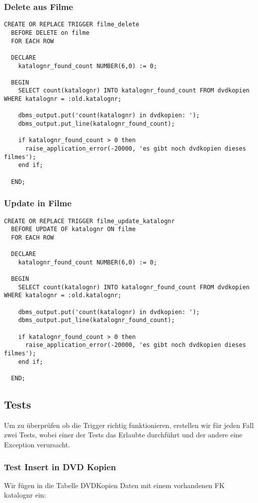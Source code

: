 \documentclass[11pt,a4paper,parskip=half]{scrartcl}
\begin{document}
\subsubsection{Delete aus Filme}
\begin{lstlisting}
CREATE OR REPLACE TRIGGER filme_delete
  BEFORE DELETE on filme
  FOR EACH ROW
  
  DECLARE
    katalognr_found_count NUMBER(6,0) := 0;
    
  BEGIN
    SELECT count(katalognr) INTO katalognr_found_count FROM dvdkopien WHERE katalognr = :old.katalognr;
    
    dbms_output.put('count(katalognr) in dvdkopien: ');
    dbms_output.put_line(katalognr_found_count);
    
    if katalognr_found_count > 0 then
      raise_application_error(-20000, 'es gibt noch dvdkopien dieses filmes');
    end if;
    
  END;
\end{lstlisting}

\subsubsection{Update in Filme}
\begin{lstlisting}
CREATE OR REPLACE TRIGGER filme_update_katalognr
  BEFORE UPDATE OF katalognr ON filme
  FOR EACH ROW
  
  DECLARE
    katalognr_found_count NUMBER(6,0) := 0;
    
  BEGIN
    SELECT count(katalognr) INTO katalognr_found_count FROM dvdkopien WHERE katalognr = :old.katalognr;
    
    dbms_output.put('count(katalognr) in dvdkopien: ');
    dbms_output.put_line(katalognr_found_count);
    
    if katalognr_found_count > 0 then
      raise_application_error(-20000, 'es gibt noch dvdkopien dieses filmes');
    end if;
    
  END;
\end{lstlisting}

\subsection{Tests}
Um zu überprüfen ob die Trigger richtig funktionieren, erstellen wir für jeden Fall zwei Tests, wobei einer der Tests das Erlaubte durchführt und der andere eine Exception verursacht.

\subsubsection{Test Insert in DVD Kopien}
Wir fügen in die Tabelle DVDKopien Daten mit einem vorhandenen FK katalognr ein:
\end{document}
